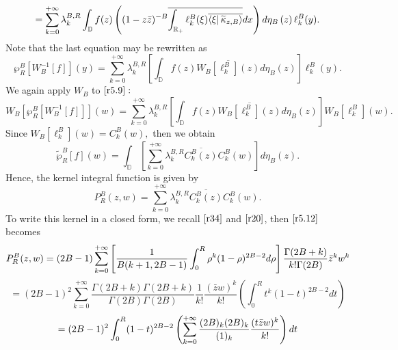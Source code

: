 \begin{equation}
\label{r5.8}
=\sum_{k=0}^{+\infty }\lambda _{k}^{B,R}\int_{\mathbb{D}}f(z)\left( (1-z\bar{%
z})^{-B}\overline{\int_{\mathbb{R}_{+}}\ell _{k}^{B}(\xi )\overline{%
\left\langle \xi \right\vert \widetilde{\kappa }_{z,B}\rangle }}dx\right)
d\eta _{B}\left( z\right) \ell _{k}^{B}(y).  
\end{equation}
Note that the last equation may be rewritten as
\begin{equation}
\label{r5.9}
\wp _{R}^{B}\left[ W_{B}^{-1}[f]\right] (y)=\sum_{k=0}^{+\infty }\lambda
_{k}^{B,R}\left[ \int_{\mathbb{D}}f(z)\overline{W_{B}[\ell _{k}^{B}](z)}%
d\eta _{B}(z)\right] \ell _{k}^{B}(y).  
\end{equation}
We again apply $W_{B}$ to $\eqref{r5.9}:$ 
\begin{equation}
\label{r5.10}
W_{B}\left[ \wp _{R}^{B}\left[ W_{B}^{-1}[f]\right] \right]
(w)=\sum_{k=0}^{+\infty }\lambda _{k}^{B,R}\left[ \int_{\mathbb{D}}f(z)%
\overline{W_{B}[\ell _{k}^{B}](z)}d\eta _{B}(z)\right] W_{B}[\ell
_{k}^{B}](w).  
\end{equation}
Since $W_{B}[\ell _{k}^{B}](w)=C_{k}^{B}(w),$ then we obtain
\begin{equation}
\label{r5.11}
\widetilde{\wp }_{R}^{B}[f](w)=\int_{\mathbb{D}}\left[ \sum_{k=0}^{+\infty
}\lambda _{k}^{B,R}\overline{C_{k}^{B}(z)}C_{k}^{B}(w)\right] d\eta _{B}(z).
\end{equation}
Hence, the kernel integral function is given by 
\begin{equation}
\label{r5.12}
P_{R}^{B}(z,w)=\sum_{k=0}^{+\infty }\lambda _{k}^{B,R}\overline{C_{k}^{B}(z)}%
C_{k}^{B}(w).  
\end{equation}
To write this kernel in a closed form, we recall $\eqref{r34} $ and $\eqref{r20} $, then $\eqref{r5.12} $ becomes%
\begin{equation}
\label{r5.13}
P_{R}^{B}(z,w)=(2B-1)\sum_{k=0}^{+\infty }\left[ \frac{1}{B(k+1,2B-1)}%
\int_{0}^{R}\rho ^{k}(1-\rho )^{2B-2}d\rho \right] \frac{\Gamma (2B+k)}{%
k!\Gamma (2B)}\bar{z}^{k}w^{k}  
\end{equation}
\begin{equation}
\label{r5.14}
=(2B-1)^{2}\sum_{k=0}^{+\infty }\frac{\Gamma (2B+k)\Gamma (2B+k)}{\Gamma
(2B)\Gamma (2B)}\frac{1}{k!}\frac{(\bar{z}w)^{k}}{k!}\left(
\int_{0}^{R}t^{k}(1-t)^{2B-2}dt\right)  
\end{equation}
\begin{equation}
\label{r5.15}
=(2B-1)^{2}\int_{0}^{R}(1-t)^{2B-2}\left( \sum_{k=0}^{+\infty }\frac{%
(2B)_{k}(2B)_{k}}{(1)_{k}}\frac{(t\bar{z}w)^{k}}{k!}\right) dt  
\end{equation}
